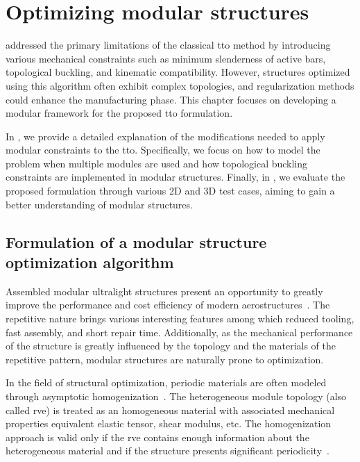 \setchapterpreamble[u]{\margintoc}
\glsresetall %
\chapter{Optimizing modular structures} \label{chap:05}
 addressed the primary limitations of the classical \gls{tto} method by introducing various mechanical constraints such as minimum slenderness of active bars, topological buckling, and kinematic compatibility. However, structures optimized using this algorithm often exhibit complex topologies, and regularization methods could enhance the manufacturing phase. This chapter focuses on developing a modular framework for the proposed \gls{tto} formulation.

In , we provide a detailed explanation of the modifications needed to apply modular constraints to the \gls{tto}. Specifically, we focus on how to model the problem when multiple modules are used and how topological buckling constraints are implemented in modular structures. Finally, in , we evaluate the proposed formulation through various 2D and 3D test cases, aiming to gain a better understanding of modular structures.

\section{Formulation of a modular structure optimization algorithm} \label{sec:05_01}
Assembled modular ultralight structures present an opportunity to greatly improve the performance and cost efficiency of modern aerostructures~. The repetitive nature brings various interesting features among which reduced tooling, fast assembly, and short repair time. Additionally, as the mechanical performance of the structure is greatly influenced by the topology and the materials of the repetitive pattern, modular structures are naturally prone to optimization.

In the field of structural optimization, periodic materials are often modeled through asymptotic homogenization~. The heterogeneous module topology (also called \gls{rve}) is treated as an homogeneous material with associated mechanical properties \ie equivalent elastic tensor, shear modulus, etc. The homogenization approach is valid only if the \gls{rve} contains enough information about the heterogeneous material and if the structure presents significant periodicity~. 


